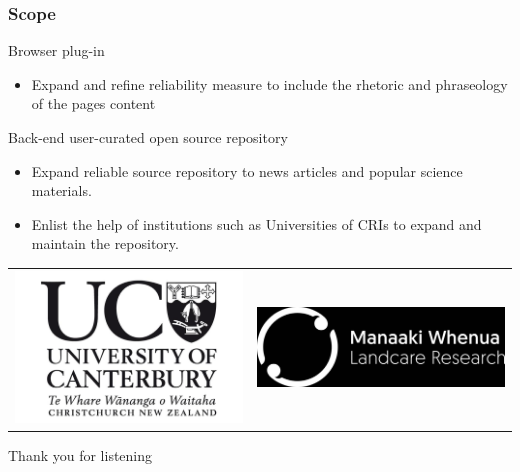 \documentclass{beamer}
\begin{document}


\begin{frame} \frametitle{Scope}
	Browser plug-in
	\begin{itemize}
	\item Expand and refine reliability measure to include the rhetoric and phraseology of the pages content
	\end{itemize}
	Back-end user-curated open source repository
	\begin{itemize}
	    \item Expand reliable source repository to news articles and popular science materials. 
	    \item Enlist the help of institutions such as Universities of CRIs to expand and maintain the repository.
	\end{itemize}
	\centering
	\begin{tabular}{ c c }
		\includegraphics[scale=0.1]{Figures/UC-Logo-3-2_3654775638524282877.jpg} & \includegraphics[scale=0.3]{Figures/mwlr-white-on-black.jpg}
	\end{tabular}
\end{frame}


\begin{frame}
	 \huge
	 \begin{center}
	 	Thank you for listening
	 \end{center} 
\end{frame}
\end{document}
